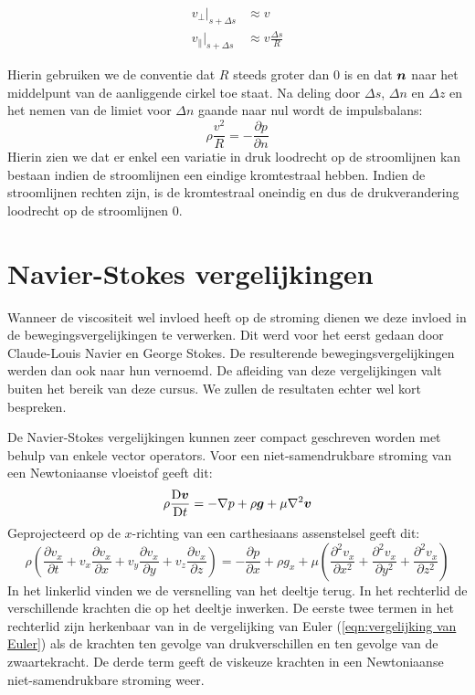 \begin{align}
	v_{\perp}|_{s+\Delta s} &\approx v \\
	v_{\parallel}|_{s+\Delta s} &\approx v \frac{\Delta s}{R}
\end{align}

Hierin gebruiken we de conventie dat $R$ steeds groter dan 0 is en dat $\boldsymbol{n}$ naar het middelpunt van de aanliggende cirkel toe staat. Na deling door $\Delta s$,  $\Delta n$ en $\Delta z$ en het nemen van de limiet voor $\Delta n$ gaande naar nul wordt de impulsbalans:
\begin{equation}
	\rho \frac{v^2}{R} = -\frac{\partial p}{\partial n}
\end{equation}
Hierin zien we dat er enkel een variatie in druk loodrecht op de stroomlijnen kan bestaan indien de stroomlijnen een eindige kromtestraal hebben. Indien de stroomlijnen rechten zijn, is de kromtestraal oneindig en dus de drukverandering loodrecht op de stroomlijnen $0$.
	
	\section{Navier-Stokes vergelijkingen}
Wanneer de viscositeit wel invloed heeft op de stroming dienen we deze invloed in de bewegingsvergelijkingen te verwerken. Dit werd voor het eerst gedaan door  Claude-Louis Navier en  George Stokes. De resulterende bewegingsvergelijkingen werden dan ook naar hun vernoemd. De afleiding van deze vergelijkingen valt buiten het bereik van deze cursus. We zullen de resultaten echter wel kort bespreken.

De Navier-Stokes vergelijkingen kunnen zeer compact geschreven worden met behulp van enkele vector operators. Voor een niet-samendrukbare stroming van een Newtoniaanse vloeistof geeft dit:
\begin{equation}
	\rho \frac{\mathrm{D} \boldsymbol{v}}{\mathrm{D} t} = -\nabla p + \rho \boldsymbol{g} + \mu \nabla^2 \boldsymbol{v}
	\label{eqn:navier-stokes vergelijkingen}
\end{equation}
Geprojecteerd op de $x$-richting van een carthesiaans assenstelsel geeft dit:
\begin{equation}
	\rho \left(\frac{\partial v_x}{\partial t} + v_x \frac{\partial v_x}{\partial x} + v_y \frac{\partial v_x}{\partial y} + v_z \frac{\partial v_x}{\partial z} \right) = -\frac{\partial p}{\partial x} +\rho g_x + \mu \left( \frac{\partial^2 v_x}{\partial x^2} + \frac{\partial^2 v_x}{\partial y^2} + \frac{\partial^2 v_x}{\partial z^2} \right)
	\label{eqn:navier-stokes vergelijkingen carthesiaans}
\end{equation}
In het linkerlid vinden we de versnelling van het deeltje terug. In het rechterlid de verschillende krachten die op het deeltje inwerken. De eerste twee termen in het rechterlid zijn herkenbaar van in de vergelijking van Euler (\ref{eqn:vergelijking van Euler}) als de krachten ten gevolge van drukverschillen en ten gevolge van de zwaartekracht. De derde term geeft de viskeuze krachten in een Newtoniaanse niet-samendrukbare stroming weer.

